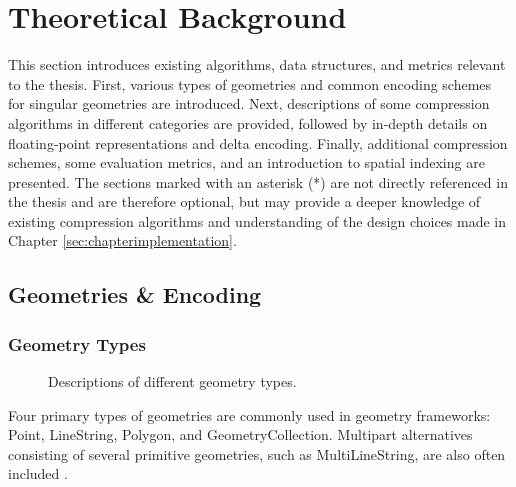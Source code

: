 \chapter{Theoretical Background}

This section introduces existing algorithms, data structures, and metrics relevant to the thesis. First, various types of geometries and common encoding schemes for singular geometries are introduced. Next, descriptions of some compression algorithms in different categories are provided, followed by in-depth details on floating-point representations and delta encoding. Finally, additional compression schemes, some evaluation metrics, and an introduction to spatial indexing are presented. The sections marked with an asterisk (*) are not directly referenced in the thesis and are therefore optional, but may provide a deeper knowledge of existing compression algorithms and understanding of the design choices made in Chapter \ref{sec:chapterimplementation}.


\section{Geometries \& Encoding}
\subsection{Geometry Types}
\begin{figure}[htbp]
    \centering
    
    \caption{Descriptions of different geometry types.}
    \label{img:geom_type}
\end{figure}
Four primary types of geometries are commonly used in geometry frameworks: Point, LineString, Polygon, and GeometryCollection. Multipart alternatives consisting of several primitive geometries, such as MultiLineString, are also often included \cite{spatialparquet}.

